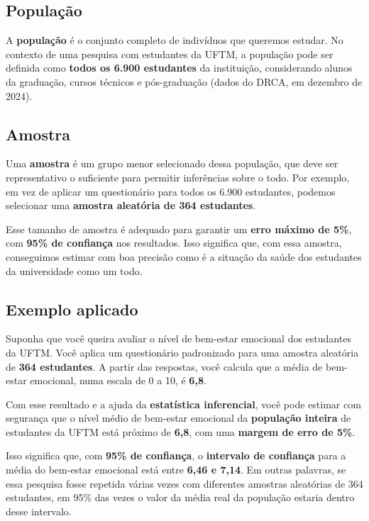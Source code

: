 \documentclass[
]{book}
\begin{document}
\subsection{\texorpdfstring{\textbf{População}}{População}}\label{populauxe7uxe3o}

A \textbf{população} é o conjunto completo de indivíduos que queremos estudar. No contexto de uma pesquisa com estudantes da UFTM, a população pode ser definida como \textbf{todos os 6.900 estudantes} da instituição, considerando alunos da graduação, cursos técnicos e pós-graduação (dados do DRCA, em dezembro de 2024).

\subsection{\texorpdfstring{\textbf{Amostra}}{Amostra}}\label{amostra}

Uma \textbf{amostra} é um grupo menor selecionado dessa população, que deve ser representativo o suficiente para permitir inferências sobre o todo. Por exemplo, em vez de aplicar um questionário para todos os 6.900 estudantes, podemos selecionar uma \textbf{amostra aleatória de 364 estudantes}.

Esse tamanho de amostra é adequado para garantir um \textbf{erro máximo de 5\%}, com \textbf{95\% de confiança} nos resultados. Isso significa que, com essa amostra, conseguimos estimar com boa precisão como é a situação da saúde dos estudantes da universidade como um todo.

\subsection{\texorpdfstring{\textbf{Exemplo aplicado}}{Exemplo aplicado}}\label{exemplo-aplicado}

Suponha que você queira avaliar o nível de bem-estar emocional dos estudantes da UFTM. Você aplica um questionário padronizado para uma amostra aleatória de \textbf{364 estudantes}. A partir das respostas, você calcula que a média de bem-estar emocional, numa escala de 0 a 10, é \textbf{6,8}.

Com esse resultado e a ajuda da \textbf{estatística inferencial}, você pode estimar com segurança que o nível médio de bem-estar emocional da \textbf{população inteira} de estudantes da UFTM está próximo de \textbf{6,8}, com uma \textbf{margem de erro de 5\%}.

Isso significa que, com \textbf{95\% de confiança}, o \textbf{intervalo de confiança} para a média do bem-estar emocional está entre \textbf{6,46 e 7,14}. Em outras palavras, se essa pesquisa fosse repetida várias vezes com diferentes amostras aleatórias de 364 estudantes, em 95\% das vezes o valor da média real da população estaria dentro desse intervalo.
\end{document}
